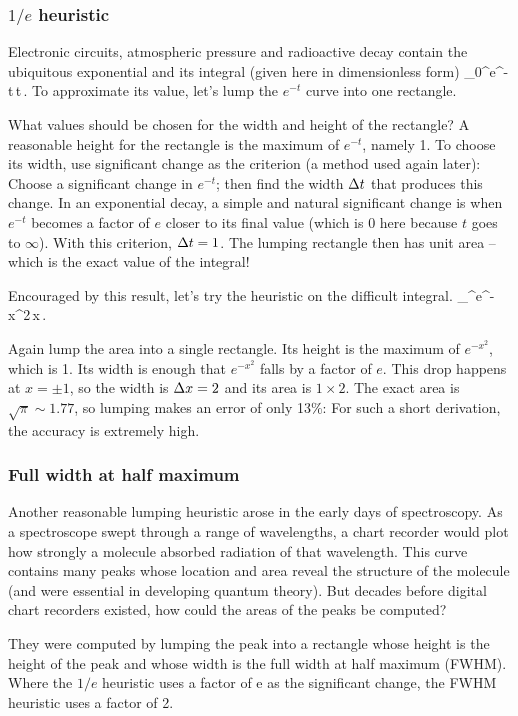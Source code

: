 \subsubsection{$1/e$ heuristic}
Electronic circuits, atmospheric pressure and radioactive decay contain the ubiquitous exponential and its integral (given here in dimensionless form)
\beq
\int_0^\infty e^{-t}\,\dx t\,.
\eeq
To approximate its value, let's lump the $e^{-t}$ curve into one rectangle.

What values should be chosen for the width and height of the rectangle? A reasonable height for the rectangle is the maximum of $e^{-t}$, namely 1. To choose its width, use significant change as the criterion (a method used again later): Choose a significant change in $e^{-t}$; then find the width $\Delta t$ that produces this change. In an exponential decay, a simple and natural significant change is when $e^{-t}$ becomes a factor of $e$ closer to its final value (which is 0 here because $t$ goes to $\infty$). With this criterion, $\Delta t = 1$. The lumping rectangle then has unit area -- which is the exact value of the integral!

Encouraged by this result, let's try the heuristic on the difficult integral.
\beq
\int_\infty^\infty e^{-x^2}\,\dx x\,.
\eeq

Again lump the area into a single rectangle. Its height is the maximum of $e^{-x^2}$, which is 1. Its width is enough that $e^{-x^2}$ falls by a factor of $e$. This drop happens at $x = \pm 1$, so the width is $\Delta x = 2$ and its area is $1\times 2$. The exact area is $\sqrt{\pi}\sim 1.77$, so lumping makes an error of only 13\%: For such a short derivation, the accuracy is extremely high.


\subsubsection{Full width at half maximum}
Another reasonable lumping heuristic arose in the early days of spectroscopy. As a spectroscope swept through a range of wavelengths, a chart recorder would plot how strongly a molecule absorbed radiation of that wavelength. This curve contains many peaks whose location and area reveal the structure of the molecule (and were essential in developing quantum theory). But decades before digital chart recorders existed, how could the areas of the peaks be computed?

They were computed by lumping the peak into a rectangle whose height is the height of the peak and whose width is the full width at half maximum (FWHM). Where the $1/e$ heuristic uses a factor of e as the significant change, the FWHM heuristic uses a factor of 2.

